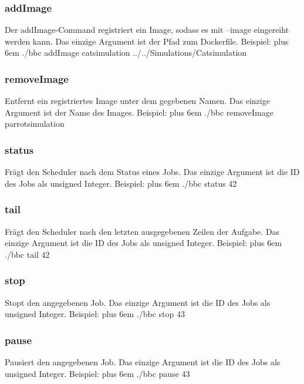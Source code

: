 \documentclass[a4paper,12pt]{article}
\makeatletter
\newenvironment{mycode}
 {\def\@xobeysp{\ }\verbatim\rightskip=0pt plus 6em\relax}
 {\endverbatim}
\makeatother
\begin{document}
\subsubsection{addImage}
Der addImage-Command registriert ein Image, sodass es mit --image eingereiht werden kann.
Das einzige Argument ist der Pfad zum Dockerfile.
Beispiel: \newline
\begin{mycode}
	./bbc addImage catsimulation ../../Simulations/Catsimulation	
\end{mycode}
\subsubsection{removeImage}
Entfernt ein registriertes Image unter dem gegebenen Namen. Das einzige Argument ist der Name des Images.
Beispiel: \newline
\begin{mycode}
	./bbc removeImage parrotsimulation
\end{mycode}
\subsubsection{status}
Frägt den Scheduler nach dem Status eines Jobs. Das einzige Argument ist die ID des Jobs als unsigned Integer. Beispiel: \newline
\begin{mycode}
	./bbc status 42
\end{mycode}
\subsubsection{tail}
Frägt den Scheduler nach den letzten ausgegebenen Zeilen der Aufgabe. Das einzige Argument ist die ID des Jobs als unsigned Integer. Beispiel: \newline
\begin{mycode}
	./bbc tail 42
\end{mycode}
\subsubsection{stop}
Stopt den angegebenen Job. Das einzige Argument ist die ID des Jobs als unsigned Integer. Beispiel: \newline
\begin{mycode}
	./bbc stop 43
\end{mycode}
\subsubsection{pause}
Pausiert den angegebenen Job. Das einzige Argument ist die ID des Jobs als unsigned Integer. Beispiel: \newline
\begin{mycode}
	./bbc pause 43
\end{mycode}
\end{document}
